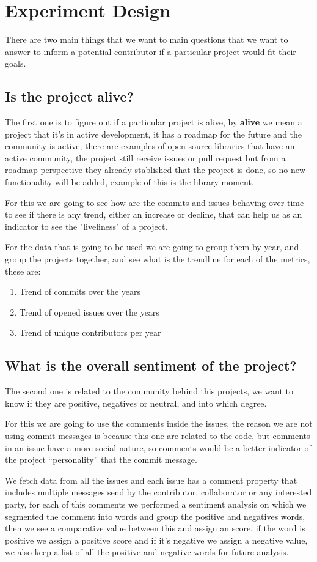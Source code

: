 \section{Experiment Design}
There are two main things that we want to main questions that we want to answer to inform a potential contributor if a particular project would fit their goals.

\subsection{Is the project alive?}
The first one is to figure out if a particular project is alive, by \textbf{alive} we mean a project that it's in active development, it has a roadmap for the future and the community is active, there are examples of open source libraries that have an active community, the project still receive issues or pull request but from a roadmap perspective they already stablished that the project is done, so no new functionality will be added, example of this is the library moment\cite{moment}.

For this we are going to see how are the commits and issues behaving over time to see if there is any trend, either an increase or decline, that can help us as an indicator to see the "liveliness" of a project.

For the data that is going to be used we are going to group them by year, and group the projects together, and see what is the trendline for each of the metrics, these are:
\begin{enumerate}
    \fontsize{10pt}{10pt}
    \selectfont
    \item Trend of commits over the years
    \item Trend of opened issues over the years
    \item Trend of unique contributors per year
\end{enumerate}

\subsection{What is the overall sentiment of the project?}
The second one is related to the community behind this projects, we want to know if they are positive, negatives or neutral, and into which degree.

For this we are going to use the comments inside the issues, the reason we are not using commit messages is because this one are related to the code, but comments in an issue have a more social nature, so comments would be a better indicator of the project “personality” that the commit message.

We fetch data from all the issues and each issue has a comment property that includes multiple messages send by the contributor, collaborator or any interested party, for each of this comments we performed a sentiment analysis on which we segmented the comment into words and group the positive and negatives words, then we see a comparative value between this and assign an score, if the word is positive we assign a positive score and if it’s negative we assign a negative value, we also keep a list of all the positive and negative words for future analysis.